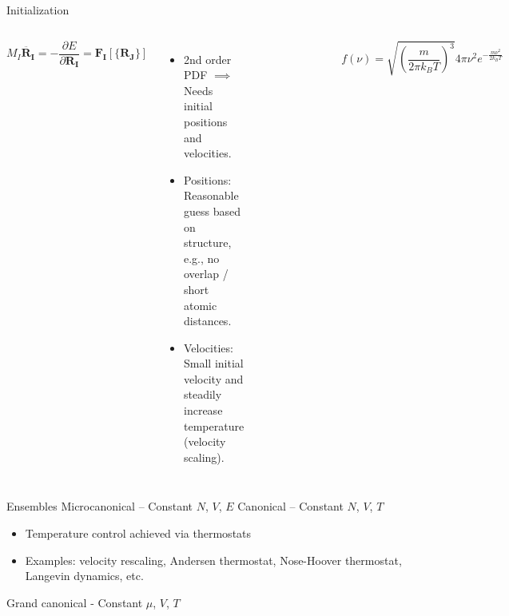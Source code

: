 \documentclass[aspectratio=169]{beamer}
\let \vec \mathbf
\begin{document}
    \begin{frame}{Initialization}

        \begin{columns}
            \begin{equation*}
                M_I \ddot{\vec{R_I}} = - \frac{\partial E}{\partial \vec{R_I}} = \vec{F_I}[\{\vec{R_J}\}]
            \end{equation*}
            \begin{itemize}
                \item 2nd order PDF $\implies$ Needs initial positions and velocities.
                \item Positions: Reasonable guess based on structure, e.g., no overlap / short atomic distances.
                \item Velocities: Small initial velocity and steadily increase temperature (velocity scaling).
            \end{itemize}

            \begin{figure}
                \centering
                \includegraphics[width=0.8\linewidth]{lectures/figures/13-Maxwell_Boltzmann.png}
            \end{figure}
            \begin{equation*}
                f(\nu)=\sqrt{\left( \frac{m}{2\pi k_BT} \right)^3} 4\pi \nu^2 e^{-\frac{m\nu^2}{2k_BT}}
            \end{equation*}
        \end{columns}
    \end{frame}

    \begin{frame}{Ensembles}
        Microcanonical – Constant $N$, $V$, $E$\newline
        \newline
        Canonical – Constant $N$, $V$, $T$
        \begin{itemize}
            \item Temperature control achieved via thermostats
            \item Examples: velocity rescaling, Andersen thermostat, Nose-Hoover thermostat, Langevin dynamics, etc.
        \end{itemize}

        Grand canonical - Constant $\mu$, $V$, $T$

    \end{frame}
\end{document}
